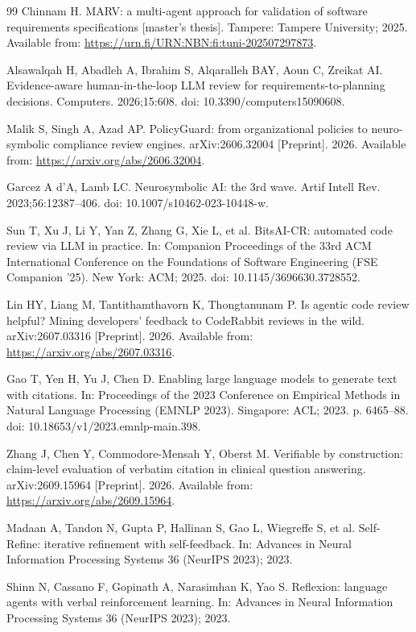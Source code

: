 \documentclass{IOS-Book-Article}
\begin{document}
\begin{thebibliography}{99}
 Chinnam H. MARV: a multi-agent approach for validation of software requirements specifications [master's thesis]. Tampere: Tampere University; 2025. Available from: \url{https://urn.fi/URN:NBN:fi:tuni-202507297873}.

 Alsawalqah H, Abadleh A, Ibrahim S, Alqaralleh BAY, Aoun C, Zreikat AI. Evidence-aware human-in-the-loop LLM review for requirements-to-planning decisions. Computers. 2026;15:608. doi: 10.3390/computers15090608.

 Malik S, Singh A, Azad AP. PolicyGuard: from organizational policies to neuro-symbolic compliance review engines. arXiv:2606.32004 [Preprint]. 2026. Available from: \url{https://arxiv.org/abs/2606.32004}.

 Garcez A d'A, Lamb LC. Neurosymbolic AI: the 3rd wave. Artif Intell Rev. 2023;56:12387--406. doi: 10.1007/s10462-023-10448-w.

 Sun T, Xu J, Li Y, Yan Z, Zhang G, Xie L, et al. BitsAI-CR: automated code review via LLM in practice. In: Companion Proceedings of the 33rd ACM International Conference on the Foundations of Software Engineering (FSE Companion '25). New York: ACM; 2025. doi: 10.1145/3696630.3728552.

 Lin HY, Liang M, Tantithamthavorn K, Thongtanunam P. Is agentic code review helpful? Mining developers' feedback to CodeRabbit reviews in the wild. arXiv:2607.03316 [Preprint]. 2026. Available from: \url{https://arxiv.org/abs/2607.03316}.


 Gao T, Yen H, Yu J, Chen D. Enabling large language models to generate text with citations. In: Proceedings of the 2023 Conference on Empirical Methods in Natural Language Processing (EMNLP 2023). Singapore: ACL; 2023. p. 6465--88. doi: 10.18653/v1/2023.emnlp-main.398.


 Zhang J, Chen Y, Commodore-Mensah Y, Oberst M. Verifiable by construction: claim-level evaluation of verbatim citation in clinical question answering. arXiv:2609.15964 [Preprint]. 2026. Available from: \url{https://arxiv.org/abs/2609.15964}.

 Madaan A, Tandon N, Gupta P, Hallinan S, Gao L, Wiegreffe S, et al. Self-Refine: iterative refinement with self-feedback. In: Advances in Neural Information Processing Systems 36 (NeurIPS 2023); 2023.

 Shinn N, Cassano F, Gopinath A, Narasimhan K, Yao S. Reflexion: language agents with verbal reinforcement learning. In: Advances in Neural Information Processing Systems 36 (NeurIPS 2023); 2023.


\end{thebibliography}
\end{document}

